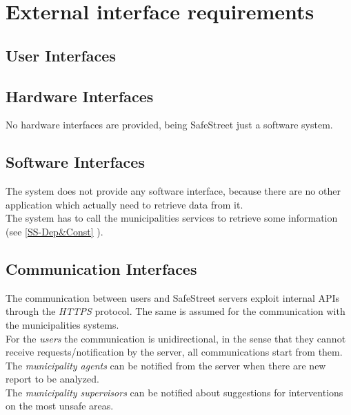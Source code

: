 \documentclass[a4paper]{report}
\begin{document}
\section{External interface requirements}
\subsection{User Interfaces}
\lipsum[1]
\subsection{Hardware Interfaces}
No hardware interfaces are provided, being SafeStreet just a software system.
\subsection{Software Interfaces}
The system does not provide any software interface, because there are no other application which actually need to retrieve data from it. \\
The system has to call the municipalities services to retrieve some information (see \ref{SS-Dep&Const} ).
\subsection{Communication Interfaces}
The communication between users and SafeStreet servers exploit internal APIs through the \textit{HTTPS} protocol. The same is assumed for the communication with the municipalities systems. \\
For the \textit{users} the communication is unidirectional, in the sense that they cannot receive requests/notification by the server, all communications start from them. \\
The \textit{municipality agents} can be notified from the server when there are new report to be analyzed. \\
The \textit{municipality supervisors} can be notified about suggestions for interventions on the most unsafe areas.
\end{document}
